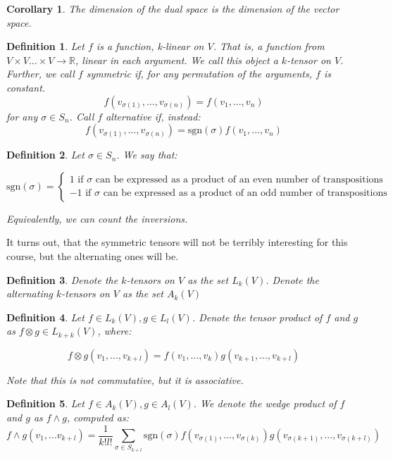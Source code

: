 \documentclass[10pt]{article}
\newtheorem{definition}{Definition}[section]
\newtheorem{corollary}{Corollary}[section]
\begin{document}
\begin{corollary}
The dimension of the dual space is the dimension of the vector space.
\end{corollary}

\begin{definition}
Let $f$ is a function, k-linear on $V$. That is, a function from $V \times V ... \times V \to \mathbb{R}$, linear in each argument. We call this object a $k$-tensor on $V$. Further, we call $f$ symmetric if, for any permutation of the arguments, $f$ is constant. $$ f(v_{\sigma(1)}, ..., v_{\sigma(n)}) = f(v_1,...,v_n)$$ for any $\sigma \in S_n$. Call $f$ alternative if, instead:
 $$ f(v_{\sigma(1)}, ..., v_{\sigma(n)}) = \text{sgn}(\sigma)f(v_1,...,v_n)$$
\end{definition}

\begin{definition}
Let $\sigma \in S_n$. We say that: 

$$ \text{sgn}(\sigma) = \begin{cases} 1 \text{ if } \sigma \text{ can be expressed as a product of an even number of transpositions} \\ -1 \text{ if } \sigma \text{ can be expressed as a product of an odd number of transpositions} \end{cases} $$

Equivalently, we can count the inversions.
\end{definition}

It turns out, that the symmetric tensors will not be terribly interesting for this course, but the alternating ones will be.

\begin{definition}
Denote the $k$-tensors on $V$ as the set $L_k(V)$.
Denote the alternating $k$-tensors on $V$ as the set $A_k(V)$
\end{definition}

\begin{definition}
Let $f \in L_k(V), g \in L_l(V)$. Denote the tensor product of $f$ and $g$ as $f \otimes g \in L_{k+k}(V)$, where:

$$ f \otimes g (v_1,...,v_{k+l}) = f(v_1,...,v_k)g(v_{k+1},...,v_{k+l}) $$

Note that this is not commutative, but it is associative.
\end{definition}

\begin{definition}
Let $f \in A_k(V), g \in A_l(V)$. We denote the wedge product of $f$ and $g$ as $f \wedge g$, computed as:
$$ f \wedge g (v_1,...v_{k+l}) = \frac{1}{k!l!} \sum_{\sigma \in S_{k+l}} \text{sgn}(\sigma)
f(v_{\sigma(1)},...,v_{\sigma(k)})g(v_{\sigma(k+1)},...,v_{\sigma(k+l)}) $$
\end{definition}
\end{document}
